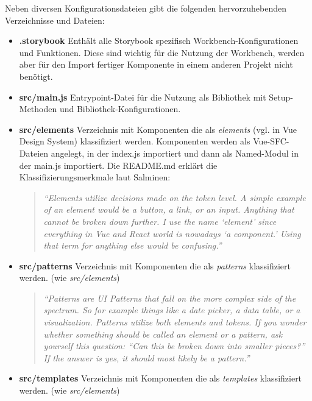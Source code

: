 Neben diversen Konfigurationsdateien gibt die folgenden hervorzuhebenden Verzeichnisse und Dateien:
\begin{itemize}
    \item \textbf{.storybook}\newline
    Enthält alle Storybook spezifisch Workbench-Konfigurationen und Funktionen. Diese sind wichtig für die Nutzung der Workbench, werden aber für den Import fertiger Komponente in einem anderen Projekt nicht benötigt.
    \item \textbf{src/main.js}\newline
    Entrypoint-Datei für die Nutzung als Bibliothek mit Setup-Methoden und Bibliothek-Konfigurationen.
    \item \textbf{src/elements}\newline
    Verzeichnis mit Komponenten die als \textit{elements} (vgl. in Vue Design System) klassifiziert werden. Komponenten werden als Vue-SFC-Dateien angelegt, in der index.js importiert und dann als Named-Modul in der main.js importiert. Die README.md erklärt die Klassifizierungsmerkmale laut Salminen:
    \begin{quotation}
        \emph{``Elements utilize decisions made on the token level. A simple example of an element would be a button, a link, or an input. Anything that cannot be broken down further. I use the name ‘element’ since everything in Vue and React world is nowadays ‘a component.’ Using that term for anything else would be confusing.''} \citep{VUEDSElements}
    \end{quotation}
    \item \textbf{src/patterns}\newline
    Verzeichnis mit Komponenten die als \textit{patterns} klassifiziert werden. (wie \textit{src/elements})
    \begin{quotation}
        \emph{``Patterns are UI Patterns that fall on the more complex side of the spectrum. So for example things like a date picker, a data table, or a visualization. Patterns utilize both elements and tokens. 
        If you wonder whether something should be called an element or a pattern, ask yourself this question: “Can this be broken down into smaller pieces?” If the answer is yes, it should most likely be a pattern.''} \citep{VUEDSPatterns}
    \end{quotation}
    \item \textbf{src/templates}\newline
    Verzeichnis mit Komponenten die als \textit{templates} klassifiziert werden. (wie \textit{src/elements})

\end{itemize}

